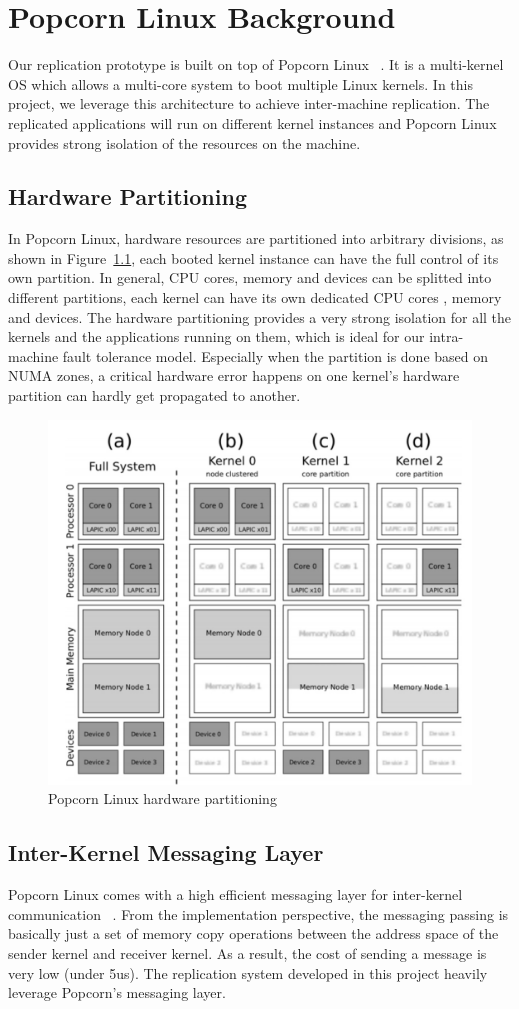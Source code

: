 \chapter{Popcorn Linux Background}
Our replication prototype is built on top of Popcorn Linux ~\cite{barbalace2014popcorn}. It is a multi-kernel OS which allows a multi-core system to boot multiple Linux kernels. In this project, we leverage this architecture to achieve inter-machine replication. The replicated applications will run on different kernel instances and Popcorn Linux provides strong isolation of the resources on the machine.
\section{Hardware Partitioning}
In Popcorn Linux, hardware resources are partitioned into arbitrary divisions, as shown in Figure~\ref{f:popcorn_arch}, each booted kernel instance can have the full control of its own partition. In general, CPU cores, memory and devices can be splitted into different partitions, each kernel can have its own dedicated CPU cores , memory and devices. The hardware partitioning provides a very strong isolation for all the kernels and the applications running on them, which is ideal for our intra-machine fault tolerance model. Especially when the partition is done based on NUMA zones, a critical hardware error happens on one kernel's hardware partition can hardly get propagated to another.

\begin{figure}[!ht]
\centering
\includegraphics[width=.6\columnwidth]{figures/popcorn_arch}
 \caption{Popcorn Linux hardware partitioning}
 \label{f:popcorn_arch}
\end{figure}

\section{Inter-Kernel Messaging Layer}
Popcorn Linux comes with a high efficient messaging layer for inter-kernel communication ~\cite{shelton2013popcorn}. From the implementation perspective, the messaging passing is basically just a set of memory copy operations between the address space of the sender kernel and receiver kernel. As a result, the cost of sending a message is very low (under 5us). The replication system developed in this project heavily leverage Popcorn’s messaging layer.

